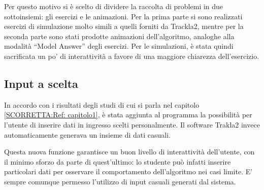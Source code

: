 Per questo motivo si è scelto di dividere la raccolta di problemi
in due sottoinsiemi: gli esercizi e le animazioni. Per la prima parte
si sono realizzati esercizi di simulazione molto simili a quelli forniti
da Trackla2, mentre per la seconda parte sono stati prodotte animazioni
dell'algoritmo, analoghe alla modalità {}``Model Answer'' degli
esercizi. Per le simulazioni, è stata quindi sacrificata un po' di
interattività a favore di una maggiore chiarezza dell'esercizio.


\subsection{\label{sub:Input-a-scelta}Input a scelta}

In accordo con i risultati degli studi di cui si parla nel capitolo
\ref{SCORRETTA:Ref: capitolo1}, è stata aggiunta al programma la
possibilità per l'utente di inserire dati in ingresso scelti personalmente.
Il software Trakla2 invece automaticamente generava un insieme di
dati casuali.

Questa nuova funzione garantisce un buon livello di interattività
dell'utente, con il minimo sforzo da parte di quest'ultimo: lo studente
può infatti inserire particolari dati per osservare il comportamento
dell'algoritmo nei casi limite. E' sempre comunque permesso l'utilizzo
di input casuali generati dal sistema.

